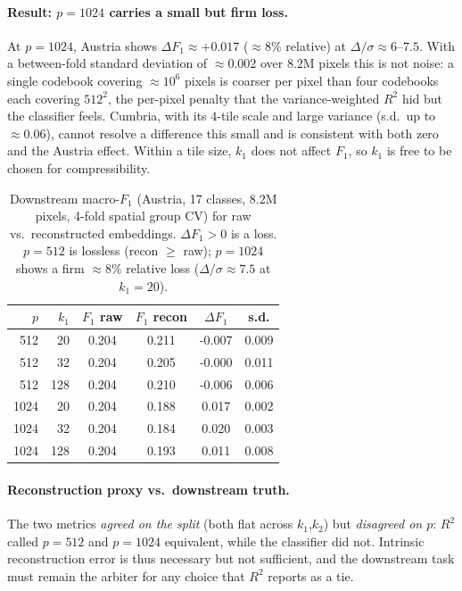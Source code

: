 \documentclass[11pt]{article}
\begin{document}
\paragraph{Result: $p=1024$ carries a small but firm loss.}
At $p=1024$, Austria shows $\Delta F_1\approx+0.017$ ($\approx8\%$ relative) at
$\Delta/\sigma\approx6$--$7.5$. With a between-fold standard deviation of
${\approx}0.002$ over $8.2\mathrm{M}$ pixels this is not noise: a single codebook
covering ${\approx}10^6$ pixels is coarser per pixel than four codebooks each
covering $512^2$, the per-pixel penalty that the variance-weighted $R^2$ hid but
the classifier feels. Cumbria, with its $4$-tile scale and large variance
(s.d.\ up to ${\approx}0.06$), cannot resolve a difference this small and is
consistent with both zero and the Austria effect. Within a tile size, $k_1$ does
not affect $F_1$, so $k_1$ is free to be chosen for compressibility.

\begin{table}[t]
\centering
\caption{Downstream macro-$F_1$ (Austria, 17 classes, $8.2\mathrm{M}$ pixels,
4-fold spatial group CV) for raw vs.\ reconstructed embeddings. $\Delta F_1>0$ is
a loss. $p=512$ is lossless (recon $\ge$ raw); $p=1024$ shows a firm
${\approx}8\%$ relative loss ($\Delta/\sigma\approx7.5$ at $k_1=20$).}
\label{tab:downstream}
\begin{tabular}{r r S[table-format=1.3] S[table-format=1.3] S[table-format=2.3] S[table-format=1.3]}
\toprule
$p$ & $k_1$ & {$F_1$ raw} & {$F_1$ recon} & {$\Delta F_1$} & {s.d.} \\
  & 20  & 0.204 & 0.211 & -0.007 & 0.009 \\
512  & 32  & 0.204 & 0.205 & -0.000 & 0.011 \\
512  & 128 & 0.204 & 0.210 & -0.006 & 0.006 \\
1024 & 20  & 0.204 & 0.188 &  0.017 & 0.002 \\
1024 & 32  & 0.204 & 0.184 &  0.020 & 0.003 \\
1024 & 128 & 0.204 & 0.193 &  0.011 & 0.008 \\
\bottomrule
\end{tabular}
\end{table}

\paragraph{Reconstruction proxy vs.\ downstream truth.}
The two metrics \emph{agreed on the split} (both flat across $k_1$,$k_2$) but
\emph{disagreed on $p$}: $R^2$ called $p=512$ and $p=1024$ equivalent, while the
classifier did not. Intrinsic reconstruction error is thus necessary but not
sufficient, and the downstream task must remain the arbiter for any choice that
$R^2$ reports as a tie.
\end{document}
